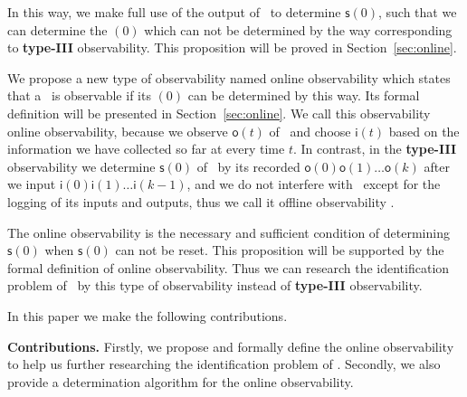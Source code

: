 In this way, we make full use of the output of \BCN\ to determine $\mathsf{s}(0)$, such that we can determine the \State$(0)$ which can not be determined by the way corresponding to {\bf type-III} observability. This proposition will be proved in Section~\ref{sec:online}. 
 
 We propose a new type of observability named online observability which states that a \BCN\ is observable if its \State$(0)$ can be determined by this way. Its formal definition will be presented in Section~\ref{sec:online}. We call this observability online observability, because we observe $\mathsf{o}(t)$ of \BCN\ and choose $\mathsf{i}(t)$ based on the information we have collected so far at every time $t$. In contrast, in the {\bf type-III} observability we determine $\mathsf{s}(0)$ of \BCN\ by its recorded $\mathsf{o}(0)\mathsf{o}(1)\ldots\mathsf{o}(k)$ after we input $\mathsf{i}(0)\mathsf{i}(1)\ldots\mathsf{i}(k-1)$, and  we do not interfere with \BCN\ except for the logging of its inputs and outputs, thus we call it offline observability \cite{Cassar2017A}.
 
  The online observability is the necessary and sufficient condition of determining $\mathsf{s}(0)$ when $\mathsf{s}(0)$ can not be reset. This proposition will be supported by the formal definition of  online observability.  Thus we can research the identification problem of \BCNs\ by this type of observability instead of {\bf type-III} observability.




In this paper we make the following contributions.

\medskip\noindent
{\bf Contributions.}
Firstly, we propose and formally define the online observability to help us further researching the identification problem of \BCN. %
Secondly, we also provide a determination algorithm for the online observability. %

